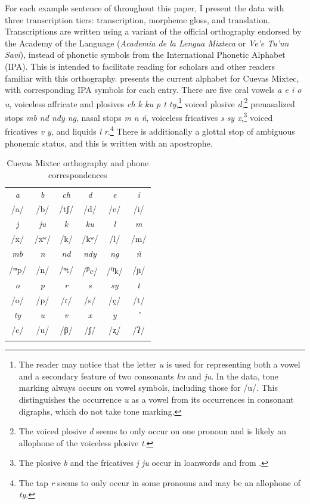 \documentclass[output=paper,modfonts,nonflat]{langsci/langscibook}
\begin{document}
For each example sentence of  throughout this paper, I present the data with three transcription tiers: transcription, morpheme gloss, and translation.  Transcriptions are written using a variant of the official  orthography endorsed by the Academy of the  Language (\textit{Academia de la Lengua Mixteca} or \textit{Ve'e Tu'un Savi}), instead of phonetic symbols from the International Phonetic Alphabet (IPA).  This is intended to facilitate reading for  scholars and other readers familiar with this orthography.   presents the current alphabet for Cuevas Mixtec, with corresponding IPA symbols for each entry.  There are five oral vowels \textit{a e i o u}, voiceless affricate and plosives \textit{ch k ku p t ty},\footnote{The reader may notice that the letter \textit{u} is used for representing both a vowel and a secondary feature of two consonants \textit{ku} and \textit{ju}.  In the data, tone marking always occurs on vowel symbols, including those for /u/.  This distinguishes the occurrence \textit{u} as a vowel from its occurrences in consonant digraphs, which do not take tone marking.} voiced plosive \textit{d},\footnote{The voiced plosive \textit{d} seems to only occur on one pronoun and is likely an allophone of the voiceless plosive \textit{t}.} prenasalized stops \textit{mb nd ndy ng}, nasal stops \textit{m n \~n}, voiceless fricatives \textit{s sy x},\footnote{The plosive \textit{b} and the fricatives \textit{j ju} occur in loanwords and  from .} voiced fricatives \textit{v y}, and liquids \textit{l r}.\footnote{The tap \textit{r} seems to only occur in some pronouns and may be an allophone of \textit{ty}.}  There is additionally a glottal stop of ambiguous phonemic status, and this is written with an apostrophe.

\begin{table}[ht]
\caption{Cuevas Mixtec orthography and phone correspondences\label{tab:cisneros:1}}
\begin{tabular}{cccccc} 
\lsptoprule
\textit{a} & \textit{b} & \textit{ch} & \textit{d} & \textit{e} & \textit{i}\\ 
/a/ & /b/ & /tʃ/ & /d/ & /e/ & /i/ \\
\midrule
\textit{j} & \textit{ju} & \textit{k} & \textit{ku} & \textit{l} & \textit{m}\\
/x/ & /xʷ/ & /k/ & /kʷ/ & /l/ & /m/\\
\midrule
 \textit{mb} & \textit{n} & \textit{nd} & \textit{ndy} & \textit{ng} & \textit{ñ}\\ 
/ᵐp/ & /n/ & /ⁿt/ & /\textsuperscript{ɲ}c/ & /\textsuperscript{ŋ}k/ & /ɲ/\\
\midrule
\textit{o} & \textit{p} & \textit{r} & \textit{s} & \textit{sy} & \textit{t}\\
/o/ & /p/ & /ɾ/ & /s/ & /ç/ & /t/\\
\midrule
\textit{ty} & \textit{u} & \textit{v} & \textit{x} & \textit{y} & \textit{'}\\
/c/ & /u/ & /β/ & /ʃ/ & /ʐ/ & /ʔ/\\
\lspbottomrule
\end{tabular}
\end{table}
\end{document}
